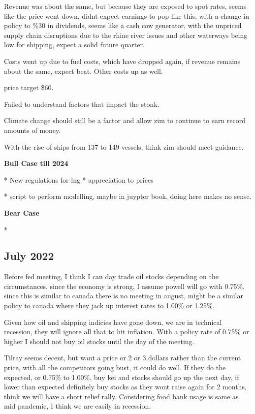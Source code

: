 Revenue was about the same, but because they are exposed to spot rates, seems like the price went down, didnt expect earnings to pop like this, with a change in policy to \%30 in dividends, seems like a cash cow generator, with the unpriced supply chain disruptions due to the rhine river issues and other waterways being low for shipping, expect a solid future quarter. 

Costs went up due to fuel costs, which have dropped again, if revenue remains about the same, expect beat. Other costs up as well.

price target \$60.

Failed to understand factors that impact the stonk.

Climate change should still be a factor and allow zim to continue to earn record amounts of money.

With the rise of ships from 137 to 149 vessels, think zim should meet guidance.

\textbf{Bull Case till 2024}

* New regulations for lng
* appreciation to prices

* script to perform modelling, maybe in juypter book, doing here makes no sense.

\textbf{Bear Case}

* 
\subsection{July 2022}

Before fed meeting, I think I can day trade oil stocks depending on the circumstances, since the economy is strong, I assume powell will go with 0.75\%, since this is similar to canada there is no meeting in august, might be a similar policy to canada where they jack up interest rates to 1.00\% or 1.25\%.

Given how oil and shipping indicies have gone down, we are in technical recession, they will ignore all that to hit inflation. With a policy rate of 0.75\% or higher I should not buy oil stocks until the day of the meeting.

Tilray seems decent, but want a price or 2 or 3 dollars rather than the current price, with all the competitors going bust, it could do well. If they do the expected, or 0.75\% to 1.00\%, buy kei and stocks should go up the next day, if lower than expected definitely buy stocks as they wont raise again for 2 months, think we will have a short relief rally. Considering food bank usage is same as mid pandemic, I think we are easily in recession.


